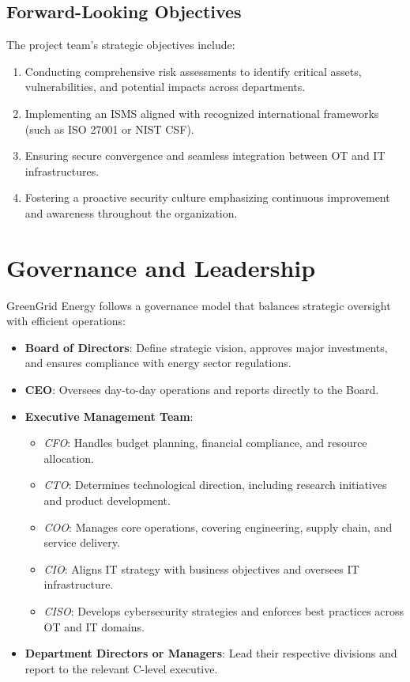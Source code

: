 \subsection{Forward-Looking Objectives}

The project team's strategic objectives include:

\begin{enumerate}
    \item Conducting comprehensive risk assessments to identify critical assets, vulnerabilities, and potential impacts across departments.
    \item Implementing an \ac{ISMS} aligned with recognized international frameworks (such as ISO 27001 or \ac{NIST} \ac{CSF}).
    \item Ensuring secure convergence and seamless integration between \ac{OT} and \ac{IT} infrastructures.
    \item Fostering a proactive security culture emphasizing continuous improvement and awareness throughout the organization.
\end{enumerate}

\section{Governance and Leadership}
GreenGrid Energy follows a governance model that balances strategic oversight with efficient operations:
\begin{itemize}
    \item \textbf{Board of Directors}: Define strategic vision, approves major investments, and ensures compliance with energy sector regulations.
    \item \textbf{\ac{CEO}}: Oversees day-to-day operations and reports directly to the Board.
    \item \textbf{Executive Management Team}:
          \begin{itemize}
              \item \emph{\ac{CFO}}: Handles budget planning, financial compliance, and resource allocation.
              \item \emph{\ac{CTO}}: Determines technological direction, including research initiatives and product development.
              \item \emph{\ac{COO}}: Manages core operations, covering engineering, supply chain, and service delivery.
              \item \emph{\ac{CIO}}: Aligns IT strategy with business objectives and oversees IT infrastructure.
              \item \emph{\ac{CISO}}: Develops cybersecurity strategies and enforces best practices across \ac{OT} and \ac{IT} domains.
          \end{itemize}
    \item \textbf{Department Directors or Managers}: Lead their respective divisions and report to the relevant C-level executive.
\end{itemize}

